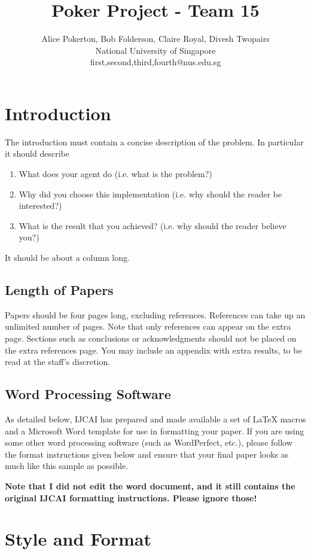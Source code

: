 \documentclass{article}
\title{Poker Project - Team 15}
\author{
Alice Pokerton, Bob Folderson,  Claire Royal, Divesh Twopairs
\\ 
National University of Singapore\\
%
first,second,third,fourth@nus.edu.sg
}
\begin{document}
\maketitle

\section{Introduction}

The introduction must contain a concise description of the problem. In particular it should describe
\begin{enumerate}
	\item What does your agent do (i.e. what is the problem?)
	\item Why did you choose this implementation (i.e. why should the reader be interested?)
	\item What is the result that you achieved? (i.e. why should the reader believe you?)
\end{enumerate}
It should be about a column long. 
\subsection{Length of Papers}

Papers should be four pages long, excluding references. References can take up an unlimited number of pages. Note that only references can appear on the extra page. Sections such as conclusions or acknowledgments should not be placed on the extra references page.
You may include an appendix with extra results, to be read at the staff's discretion.

\subsection{Word Processing Software}

As detailed below, IJCAI has prepared and made available a set of
\LaTeX{} macros and a Microsoft Word template for use in formatting
your paper. If you are using some other word processing software (such
as WordPerfect, etc.), please follow the format instructions given
below and ensure that your final paper looks as much like this sample
as possible.

{\bf Note that I did not edit the word document, and it still contains the original IJCAI formatting instructions. Please ignore those!}

\section{Style and Format}
\end{document}
